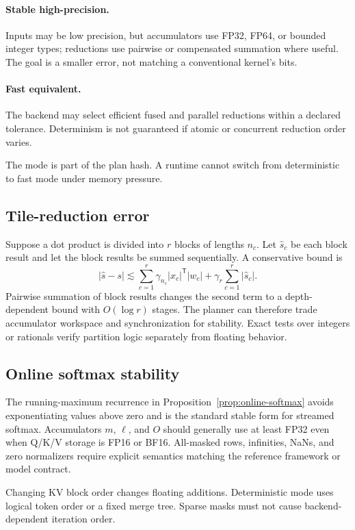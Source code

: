 \paragraph{Stable high-precision.}
Inputs may be low precision, but accumulators use FP32, FP64, or bounded integer types; reductions use pairwise or compensated summation where useful. The goal is a smaller error, not matching a conventional kernel's bits.

\paragraph{Fast equivalent.}
The backend may select efficient fused and parallel reductions within a declared tolerance. Determinism is not guaranteed if atomic or concurrent reduction order varies.

The mode is part of the plan hash. A runtime cannot switch from deterministic to fast mode under memory pressure.

\subsection{Tile-reduction error}

Suppose a dot product is divided into $r$ blocks of lengths $n_c$. Let $\widehat s_c$ be each block result and let the block results be summed sequentially. A conservative bound is
\[
  |\widehat s-s|
  \lesssim
  \sum_{c=1}^r \gamma_{n_c}|x_c|^{\mathsf T}|w_c|
  +\gamma_r\sum_{c=1}^r|\widehat s_c|.
\]
Pairwise summation of block results changes the second term to a depth-dependent bound with $O(\log r)$ stages. The planner can therefore trade accumulator workspace and synchronization for stability. Exact tests over integers or rationals verify partition logic separately from floating behavior.

\subsection{Online softmax stability}

The running-maximum recurrence in Proposition~\ref{prop:online-softmax} avoids exponentiating values above zero and is the standard stable form for streamed softmax. Accumulators $m$, $\ell$, and $O$ should generally use at least FP32 even when Q/K/V storage is FP16 or BF16. All-masked rows, infinities, NaNs, and zero normalizers require explicit semantics matching the reference framework or model contract.

Changing KV block order changes floating additions. Deterministic mode uses logical token order or a fixed merge tree. Sparse masks must not cause backend-dependent iteration order.


